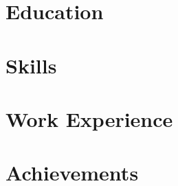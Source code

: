 \documentclass[letter,10pt]{article}
\begin{document}


\section{Education}


\section{Skills}


\section{Work Experience}



\section{Achievements}

\end{document}
